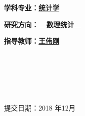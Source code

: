 \documentclass[a4paper,12pt,openany,oneside,utf-8]{ctexbook}
\newcommand{\chuhao}{\fontsize{48pt}{\baselineskip}\selectfont}
\newcommand{\xiaoerhao}{\fontsize{17pt}{\baselineskip}\selectfont}
\newcommand{\sanhao}{\fontsize{15.75pt}{\baselineskip}\selectfont}
\begin{document}
\begin{titlepage}
\begin{center}
\textbf{\kaishu\sanhao 学科专业：\underline{\quad \quad \quad 统计学 \quad \quad \quad \quad}}
\end{center}


\begin{center}
\textbf{\kaishu\sanhao 研究方向：\underline{\quad \quad \ \ 数理统计 \ \quad \quad\quad}}
\end{center}

\begin{center}
\textbf{\kaishu\sanhao 指导教师：\underline{\quad \quad \quad  王伟刚 \quad \quad \quad \quad  }}
\end{center}

\

\

\


\begin{center}
\kaishu\sanhao 提交日期：2018 年12月
\end{center}

%
%
%
%
%
%
%
%
%
%


\end{titlepage}
\end{document}
